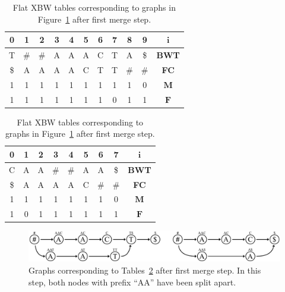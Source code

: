 \documentclass[a4paper,12pt,twoside,BCOR=10mm]{scrbook}
\begin{document}
\begin{table}[htb]
\centering
\caption[Flat XBW tables after first merge step]{Flat XBW tables corresponding to graphs in Figure~\ref{fig:evo_fig_flat_merge_step_one} after first merge step.}
{
\renewcommand{\tabcolsep}{5pt}
\begin{tabular}{ | c | c | c | c | c | c | c | c | c | c | c | }
\hline
0 & 1 & 2 & 3 & 4 & 5 & 6 & 7 & 8 & 9 & $\boldsymbol{i}$ \\ \hline
T & $\#$ & $\#$ & A & A & A & C & T & A & \$ & \textbf{BWT} \\ \hline
\$ & A & A & A & A & C & T & T & $\#$ & $\#$ & \textbf{FC} \\ \hline
1 & 1 & 1 & 1 & 1 & 1 & 1 & 1 & 1 & 0 & $\boldsymbol{M}$ \\ \hline
1 & 1 & 1 & 1 & 1 & 1 & 1 & 0 & 1 & 1 & $\boldsymbol{F}$ \\ \hline
\end{tabular}
\quad
\begin{tabular}{ | c | c | c | c | c | c | c | c | c | }
\hline
0 & 1 & 2 & 3 & 4 & 5 & 6 & 7 & $\boldsymbol{i}$ \\ \hline
C & A & A & $\#$ & $\#$ & A & A & \$ & \textbf{BWT} \\ \hline
\$ & A & A & A & A & C & $\#$ & $\#$ & \textbf{FC} \\ \hline
1 & 1 & 1 & 1 & 1 & 1 & 1 & 0 & $\boldsymbol{M}$ \\ \hline
1 & 0 & 1 & 1 & 1 & 1 & 1 & 1 & $\boldsymbol{F}$ \\ \hline
\end{tabular}
}
\label{table:evo_fig_flat_merge_step_one}
\end{table}
\begin{figure}[!htb]
\centering
\includegraphics[width=\textwidth]{evo_fig_flat_merge_step_one.pdf}
\caption[Graphs after first merge step]{Graphs corresponding to Tables~\ref{table:evo_fig_flat_merge_step_one} after first merge step. In this step, both nodes with prefix “AA” have been split apart.} \label{fig:evo_fig_flat_merge_step_one}
\end{figure}
\end{document}
